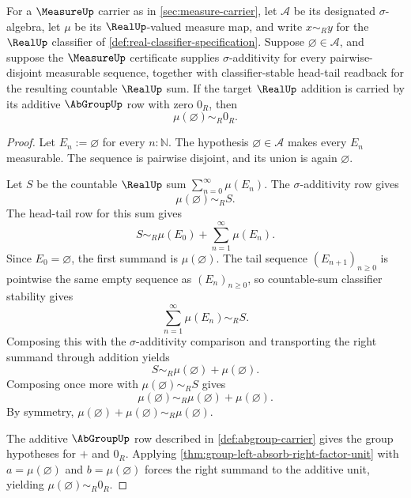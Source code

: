 \begin{theorem}
\label{thm:measure-empty-set-zero-from-sigma-additivity}
For a $\MeasureUp$ carrier as in \autoref{sec:measure-carrier}, let $\mathcal{A}$ be its designated $\sigma$-algebra, let $\mu$ be its $\RealUp$-valued measure map, and write $x\sim_R y$ for the $\RealUp$ classifier of \autoref{def:real-classifier-specification}. Suppose $\varnothing\in\mathcal{A}$, and suppose the $\MeasureUp$ certificate supplies $\sigma$-additivity for every pairwise-disjoint measurable sequence, together with classifier-stable head-tail readback for the resulting countable $\RealUp$ sum. If the target $\RealUp$ addition is carried by its additive $\AbGroupUp$ row with zero $0_R$, then
$$
\mu(\varnothing)\sim_R 0_R.
$$
\end{theorem}
\begin{proof}
Let $E_n:=\varnothing$ for every $n:\mathbb{N}$. The hypothesis $\varnothing\in\mathcal{A}$ makes every $E_n$ measurable. The sequence is pairwise disjoint, and its union is again $\varnothing$.

Let $S$ be the countable $\RealUp$ sum $\sum_{n=0}^{\infty}\mu(E_n)$. The $\sigma$-additivity row gives
$$
\mu(\varnothing)\sim_R S.
$$
The head-tail row for this sum gives
$$
S\sim_R\mu(E_0)+\sum_{n=1}^{\infty}\mu(E_n).
$$
Since $E_0=\varnothing$, the first summand is $\mu(\varnothing)$. The tail sequence $(E_{n+1})_{n\geq0}$ is pointwise the same empty sequence as $(E_n)_{n\geq0}$, so countable-sum classifier stability gives
$$
\sum_{n=1}^{\infty}\mu(E_n)\sim_R S.
$$
Composing this with the $\sigma$-additivity comparison and transporting the right summand through addition yields
$$
S\sim_R\mu(\varnothing)+\mu(\varnothing).
$$
Composing once more with $\mu(\varnothing)\sim_R S$ gives
$$
\mu(\varnothing)\sim_R\mu(\varnothing)+\mu(\varnothing).
$$
By symmetry, $\mu(\varnothing)+\mu(\varnothing)\sim_R\mu(\varnothing)$.

The additive $\AbGroupUp$ row described in \autoref{def:abgroup-carrier} gives the group hypotheses for $+$ and $0_R$. Applying \autoref{thm:group-left-absorb-right-factor-unit} with $a=\mu(\varnothing)$ and $b=\mu(\varnothing)$ forces the right summand to the additive unit, yielding $\mu(\varnothing)\sim_R0_R$.
\end{proof}

